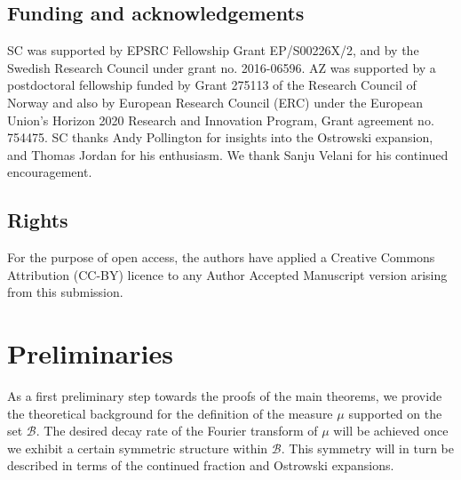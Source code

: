 \documentclass[12pt, reqno]{amsart}
\theoremstyle{definition}
\theoremstyle{remark}
\numberwithin{equation}{section}
\def \cB {\mathcal B}
\begin{document}
	\subsection*{Funding and acknowledgements} 
	
	SC was supported by EPSRC Fellowship Grant EP/S00226X/2, and by the Swedish Research Council under grant no. 2016-06596. AZ was supported by a postdoctoral fellowship funded by Grant 275113 of the Research Council
	of Norway and also by European Research Council (ERC) under the European Union’s Horizon 2020 Research and Innovation Program, Grant agreement no. 754475. SC thanks Andy Pollington for insights into the Ostrowski expansion, and Thomas Jordan for his enthusiasm. We thank Sanju Velani for his continued encouragement.
	
	\subsection*{Rights} 
	For the purpose of open access, the authors have applied a Creative Commons Attribution (CC-BY) licence to any Author Accepted Manuscript version arising from this submission.
	
	\section{Preliminaries}
	\label{prelims}
	
	As a first preliminary step towards the proofs of the main theorems, we provide the theoretical background for the definition of the measure $\mu$ supported on the set $\cB.$ The desired decay rate of the Fourier transform of $\mu$ will be achieved once we exhibit a certain symmetric structure within $\cB.$ This symmetry will in turn be described in terms of the continued fraction and Ostrowski expansions. 
	
\end{document}
